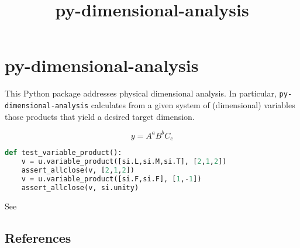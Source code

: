 \documentclass[11pt]{article}
\title{py-dimensional-analysis}
\date{}
\begin{document}
\maketitle

\section{py-dimensional-analysis}
This Python package addresses physical dimensional analysis. In particular, \texttt{py-dimensional-analysis} calculates from a given system of (dimensional) variables those products that yield a desired target dimension.

\begin{equation}
    y = A^aB^bC_c
\end{equation}

\begin{lstlisting}[language=Python]
def test_variable_product():        
    v = u.variable_product([si.L,si.M,si.T], [2,1,2])
    assert_allclose(v, [2,1,2])
    v = u.variable_product([si.F,si.F], [1,-1])
    assert_allclose(v, si.unity)
\end{lstlisting}

See \cite{szirtes2007applied}

\subsection{References}

\begingroup
\renewcommand{\section}[2]{}%

\endgroup
\end{document}
